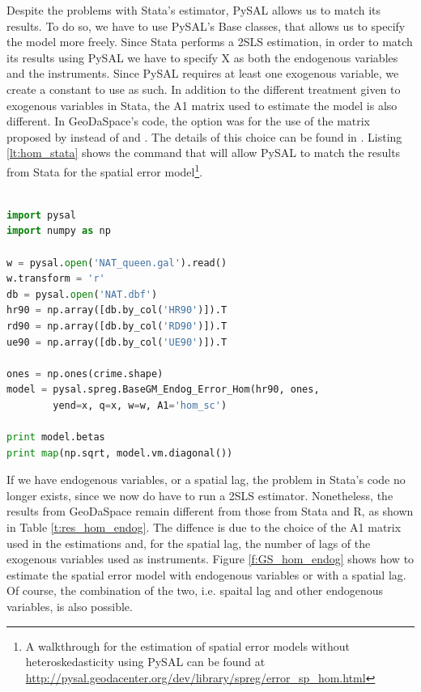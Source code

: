 \documentclass{article}
\begin{document}
Despite the problems with Stata's estimator, PySAL allows us to match its results. To do so, we have to use PySAL's Base classes, that allows us to specify the model more freely. Since Stata performs a 2SLS estimation, in order to match its results using PySAL we have to specify X as both the endogenous variables and the instruments. Since PySAL requires at least one exogenous variable, we create a constant to use as such. In addition to the different treatment given to exogenous variables in Stata, the A1 matrix used to estimate the model is also different. In GeoDaSpace's code, the option was for the use of the matrix proposed by \citet{Arraiz10} instead of \citet{Drukker10} and \citet{Drukker11}. The details of this choice can be found in \citet{Anselin11}. Listing \ref{lt:hom_stata} shows the command that will allow PySAL to match the results from Stata for the spatial error model\footnote{A walkthrough for the estimation of spatial error models without heteroskedasticity using PySAL can be found at \url{http://pysal.geodacenter.org/dev/library/spreg/error_sp_hom.html}}. 

\begin{code}
\begin{lstlisting}[label=lt:hom_stata,caption=Using PySAL to match the results of spatial error models from Stata,language=Python]

import pysal
import numpy as np

w = pysal.open('NAT_queen.gal').read()
w.transform = 'r'
db = pysal.open('NAT.dbf')
hr90 = np.array([db.by_col('HR90')]).T
rd90 = np.array([db.by_col('RD90')]).T
ue90 = np.array([db.by_col('UE90')]).T

ones = np.ones(crime.shape)
model = pysal.spreg.BaseGM_Endog_Error_Hom(hr90, ones,
        yend=x, q=x, w=w, A1='hom_sc')

print model.betas
print map(np.sqrt, model.vm.diagonal())

\end{lstlisting}
\end{code}

If we have endogenous variables, or a spatial lag, the problem in Stata's code no longer exists, since we now do have to run a 2SLS estimator. Nonetheless, the results from GeoDaSpace remain different from those from Stata and R, as shown in Table \ref{t:res_hom_endog}. The diffence is due to the choice of the A1 matrix used in the estimations and, for the spatial lag, the number of lags of the exogenous variables used as instruments. Figure \ref{f:GS_hom_endog} shows how to estimate the spatial error model with endogenous variables or with a spatial lag. Of course, the combination of the two, i.e. spaital lag and other endogenous variables, is also possible.
\end{document}
